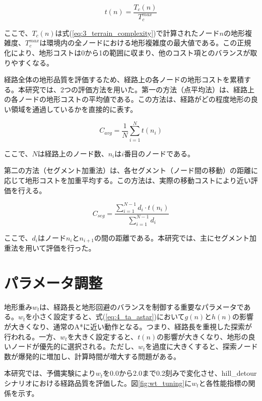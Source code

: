 \begin{equation}
t(n) = \frac{T_c(n)}{T_c^{max}}
\label{eq:4_terrain_cost}
\end{equation}

ここで、$T_c(n)$は式(\ref{eq:3_terrain_complexity})で計算されたノード$n$の地形複雑度、$T_c^{max}$は環境内の全ノードにおける地形複雑度の最大値である。この正規化により、地形コストは0から1の範囲に収まり、他のコスト項とのバランスが取りやすくなる。

経路全体の地形品質を評価するため、経路上の各ノードの地形コストを累積する。本研究では、2つの評価方法を用いた。第一の方法（点平均法）は、経路上の各ノードの地形コストの平均値である。この方法は、経路がどの程度地形の良い領域を通過しているかを直接的に表す。

\begin{equation}
C_{avg} = \frac{1}{N} \sum_{i=1}^{N} t(n_i)
\label{eq:4_point_average}
\end{equation}

ここで、$N$は経路上のノード数、$n_i$は$i$番目のノードである。

第二の方法（セグメント加重法）は、各セグメント（ノード間の移動）の距離に応じて地形コストを加重平均する。この方法は、実際の移動コストにより近い評価を行える。

\begin{equation}
C_{seg} = \frac{\sum_{i=1}^{N-1} d_i \cdot t(n_i)}{\sum_{i=1}^{N-1} d_i}
\label{eq:4_segment_weighted}
\end{equation}

ここで、$d_i$はノード$n_i$と$n_{i+1}$の間の距離である。本研究では、主にセグメント加重法を用いて評価を行った。

\section{パラメータ調整}

地形重み$w_t$は、経路長と地形回避のバランスを制御する重要なパラメータである。$w_t$を小さく設定すると、式(\ref{eq:4_ta_astar})において$g(n)$と$h(n)$の影響が大きくなり、通常のA*に近い動作となる。つまり、経路長を重視した探索が行われる。一方、$w_t$を大きく設定すると、$t(n)$の影響が大きくなり、地形の良いノードが優先的に選択される。ただし、$w_t$を過度に大きくすると、探索ノード数が爆発的に増加し、計算時間が増大する問題がある。

本研究では、予備実験により$w_t$を0.0から2.0まで0.2刻みで変化させ、hill\_detourシナリオにおける経路品質を評価した。図\ref{fig:wt_tuning}に$w_t$と各性能指標の関係を示す。

